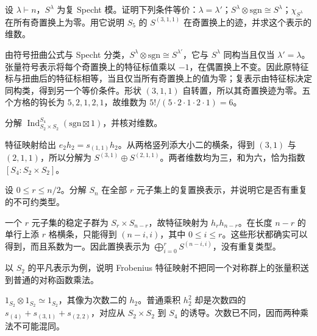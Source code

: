 \begin{exercise}\label{b5:ex:07-sign-twist}
	设 \(\lambda\vdash n\)，\(S^\lambda\) 为复 Specht 模。证明下列条件等价：\(\lambda=\lambda'\)；\(S^\lambda\otimes\mathrm{sgn}\cong S^\lambda\)；\(\chi_{S^\lambda}\) 在所有奇置换上为零。用它说明 \(S_5\) 的 \(S^{(3,1,1)}\) 在奇置换上的迹，并求这个表示的维数。
\end{exercise}
\begin{solution}
	由符号扭曲公式与 Specht 分类，\(S^\lambda\otimes\mathrm{sgn}\cong S^{\lambda'}\)，它与 \(S^\lambda\) 同构当且仅当 \(\lambda'=\lambda\)。张量符号表示将每个奇置换上的特征标值乘以 \(-1\)，在偶置换上不变。因此原特征标与扭曲后的特征标相等，当且仅当所有奇置换上的值为零；复表示由特征标决定同构类，得到另一个等价条件。形状 \((3,1,1)\) 自转置，所以其奇置换迹为零。五个方格的钩长为 \(5,2,1,2,1\)，故维数为 \(5!/(5\cdot2\cdot1\cdot2\cdot1)=6\)。
\end{solution}

\begin{exercise}\label{b5:ex:07-induced-sign-trivial}
	分解 \(\operatorname{Ind}_{S_2\times S_2}^{S_4}(\mathrm{sgn}\boxtimes1)\)，并核对维数。
\end{exercise}
\begin{solution}
	特征映射给出 \(e_2h_2=s_{(1,1)}h_2\)。从两格竖列添大小二的横条，得到 \((3,1)\) 与 \((2,1,1)\)，所以分解为 \(S^{(3,1)}\oplus S^{(2,1,1)}\)。两者维数均为三，和为六，恰为指数 \([S_4:S_2\times S_2]\)。
\end{solution}

\begin{exercise}\label{b5:ex:07-subset-permutation}
	设 \(0\le r\le n/2\)。分解 \(S_n\) 在全部 \(r\) 元子集上的复置换表示，并说明它是否有重复的不可约类型。
\end{exercise}
\begin{solution}
	一个 \(r\) 元子集的稳定子群为 \(S_r\times S_{n-r}\)，故特征映射为 \(h_rh_{n-r}\)。在长度 \(n-r\) 的单行上添 \(r\) 格横条，只能得到 \((n-i,i)\)，其中 \(0\le i\le r\)。这些形状都确实可以得到，而且系数为一。因此置换表示为 \(\bigoplus_{i=0}^rS^{(n-i,i)}\)，没有重复类型。
\end{solution}

\begin{exercise}\label{b5:ex:07-two-products}
	以 \(S_2\) 的平凡表示为例，说明 Frobenius 特征映射不把同一个对称群上的张量积送到普通的对称函数乘法。
\end{exercise}
\begin{solution}
	\(1_{S_2}\otimes1_{S_2}\simeq1_{S_2}\)，其像为次数二的 \(h_2\)。普通乘积 \(h_2^2\) 却是次数四的 \(s_{(4)}+s_{(3,1)}+s_{(2,2)}\)，对应从 \(S_2\times S_2\) 到 \(S_4\) 的诱导。次数已不同，因而两种乘法不可能混同。
\end{solution}

